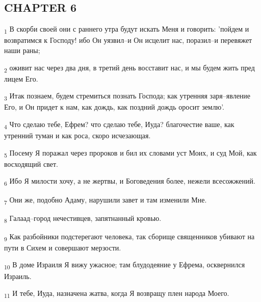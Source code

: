 \subsection{CHAPTER 6}
\begin{tcolorbox}
\textsubscript{1} В скорби своей они с раннего утра будут искать Меня и говорить: 'пойдем и возвратимся к Господу! ибо Он уязвил--и Он исцелит нас, поразил--и перевяжет наши раны;
\end{tcolorbox}
\begin{tcolorbox}
\textsubscript{2} оживит нас через два дня, в третий день восставит нас, и мы будем жить пред лицем Его.
\end{tcolorbox}
\begin{tcolorbox}
\textsubscript{3} Итак познаем, будем стремиться познать Господа; как утренняя заря--явление Его, и Он придет к нам, как дождь, как поздний дождь оросит землю'.
\end{tcolorbox}
\begin{tcolorbox}
\textsubscript{4} Что сделаю тебе, Ефрем? что сделаю тебе, Иуда? благочестие ваше, как утренний туман и как роса, скоро исчезающая.
\end{tcolorbox}
\begin{tcolorbox}
\textsubscript{5} Посему Я поражал через пророков и бил их словами уст Моих, и суд Мой, как восходящий свет.
\end{tcolorbox}
\begin{tcolorbox}
\textsubscript{6} Ибо Я милости хочу, а не жертвы, и Боговедения более, нежели всесожжений.
\end{tcolorbox}
\begin{tcolorbox}
\textsubscript{7} Они же, подобно Адаму, нарушили завет и там изменили Мне.
\end{tcolorbox}
\begin{tcolorbox}
\textsubscript{8} Галаад--город нечестивцев, запятнанный кровью.
\end{tcolorbox}
\begin{tcolorbox}
\textsubscript{9} Как разбойники подстерегают человека, так сборище священников убивают на пути в Сихем и совершают мерзости.
\end{tcolorbox}
\begin{tcolorbox}
\textsubscript{10} В доме Израиля Я вижу ужасное; там блудодеяние у Ефрема, осквернился Израиль.
\end{tcolorbox}
\begin{tcolorbox}
\textsubscript{11} И тебе, Иуда, назначена жатва, когда Я возвращу плен народа Моего.
\end{tcolorbox}
